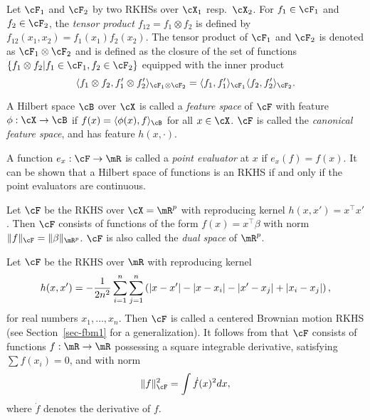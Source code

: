 \documentclass[preprint,12pt,authoryear]{elsarticle}
\DeclarePairedDelimiter{\abs}{\lvert}{\rvert}
\DeclarePairedDelimiter{\norm}{\lVert}{\rVert}
\begin{document}
Let $\cF_1$ and $\cF_2$ by two RKHSs over $\cX_1$ resp.\ $\cX_2$. For $f_1\in\cF_1$ and $f_2\in\cF_2$, the {\em tensor product} $f_{12}=f_1\otimes f_2$ is defined by $f_{12}(x_1,x_2)=f_1(x_1)f_2(x_2)$. 
The tensor product of $\cF_1$ and $\cF_2$ is denoted as $\cF_1\otimes\cF_2$ and is defined as the closure of the set of functions $\{f_1\otimes f_2|f_1\in\cF_1, f_2\in\cF_2\}$ equipped with the inner product
\[  \langle f_{1}\otimes f_2,f_{1}'\otimes f_2' \rangle_{\cF_1\otimes\cF_2} = \langle f_1,f_1'\rangle_{\cF_1}\langle f_2,f_2'\rangle_{\cF_2}. \]


A Hilbert space $\cB$ over $\cX$ is called a {\em feature space} of $\cF$ with feature $\phi:\cX\rightarrow\cB$ if $f(x)=\langle\phi(x),f\rangle_\cB$ for all $x\in\cX$. $\cF$ is called the {\em canonical feature space}, and has feature $h(x,\cdot)$.


A function $e_x:\cF\rightarrow\mR$ is called a {\em point evaluator} at $x$ if $e_x(f)=f(x)$. It can be shown that a Hilbert space of functions is an RKHS if and only if the point evaluators are continuous. 



\begin{example}\label{ex-lin}
Let $\cF$ be the RKHS over $\cX=\mR^p$ with reproducing kernel $h(x,x')=x^\top x'$. Then $\cF$ consists of functions of the form $f(x)=x^\top\beta$ with norm $\norm{f}_\cF=\norm{\beta}_{\mR^p}$. $\cF$ is also called the {\em dual space} of $\mR^p$. 
\end{example}

\begin{example}\label{ex-bm}
Let $\cF$ be the RKHS over $\mR$ with reproducing kernel
\begin{align}\label{cbm}
h(x,x') = -\frac1{2n^2}\sum_{i=1}^n\sum_{j=1}^n\left(\abs{x-x'} - |x-x_i| - |x'-x_j| + |x_i-x_j|\right), 
\end{align}
for real numbers $x_1,\ldots,x_n$. 
Then $\cF$ is called a centered Brownian motion RKHS (see Section~\ref{sec-fbm1} for a generalization).
It follows from \citet[Section 10]{vz08rep} that $\cF$ consists of functions $f:\mR\rightarrow\mR$ possessing a square integrable derivative, satisfying $\sum f(x_i)=0$, and with norm
\[ \norm{f}_{\cF}^2 = \int \dot f(x)^2dx,  \]
where $\dot f$ denotes the derivative of $f$.
\end{example}
\end{document}
